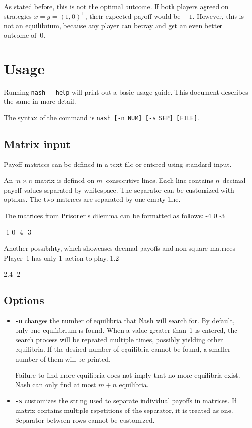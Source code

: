 \documentclass[a4paper,11pt]{article}
\newenvironment{code}{\snugshade\verbatim}{\endverbatim\endsnugshade}
\begin{document}
As stated before, this is not the optimal outcome. If both players agreed on strategies $x = y = (1, 0)^{\top}$, their expected payoff would be~$-1$. However, this is not an equilibrium, because any player can betray and get an even better outcome of~0.

\section{Usage}

Running \verb|nash --help| will print out a basic usage guide. This document describes the same in more detail.

The syntax of the command is \verb|nash [-n NUM] [-s SEP] [FILE]|.

\subsection{Matrix input}

Payoff matrices can be defined in a text file or entered using standard input.

An $m \times n$ matrix is defined on $m$~consecutive lines. Each line contains $n$~decimal payoff values separated by whitespace. The separator can be customized with options. The two matrices are separated by one empty line.

The matrices from Prisoner's dilemma can be formatted as follows:
\begin{code}
	-1  -4
	 0  -3

	-1   0
	-4  -3
\end{code}

Another possibility, which showcases decimal payoffs and non-square matrices. Player~1 has only 1~action to play.
\begin{code}
	-1  1.2
	
	2.4 -2
\end{code}

\subsection{Options}

\begin{itemize}
	\item \verb|-n| changes the number of equilibria that Nash will search for. By default, only one equilibrium is found. When a value greater than~1 is entered, the search process will be repeated multiple times, possibly yielding other equilibria. If the desired number of equilibria cannot be found, a smaller number of them will be printed.
	
	Failure to find more equilibria does not imply that no more equilibria exist. Nash can only find at most $m + n$ equilibria.

	\item \verb|-s| customizes the string used to separate individual payoffs in matrices. If matrix contains multiple repetitions of the separator, it is treated as one. Separator between rows cannot be customized.
\end{itemize}	
\end{document}
